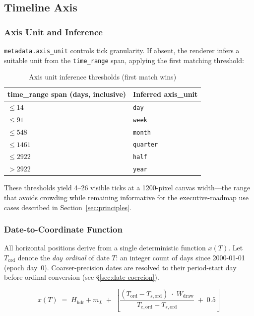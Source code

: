 \subsection{Timeline Axis}
\label{sec:rendering-axis}

\subsubsection{Axis Unit and Inference}
\label{sec:axis-inference}

\texttt{metadata.axis\_unit} controls tick granularity. If absent, the renderer infers a
suitable unit from the \texttt{time\_range} span, applying the first matching threshold:

\begin{table}[h]
\centering
\begin{tabular}{ll}
\toprule
\textbf{time\_range span (days, inclusive)} & \textbf{Inferred axis\_unit} \\
\midrule
$\leq 14$  & \texttt{day}     \\
$\leq 91$  & \texttt{week}    \\
$\leq 548$ & \texttt{month}   \\
$\leq 1461$& \texttt{quarter} \\
$\leq 2922$& \texttt{half}    \\
$> 2922$   & \texttt{year}    \\
\bottomrule
\end{tabular}
\caption{Axis unit inference thresholds (first match wins)}
\label{tab:axis-inference}
\end{table}

These thresholds yield 4--26 visible ticks at a 1200-pixel canvas width---the range that
avoids crowding while remaining informative for the executive-roadmap use cases described
in Section~\ref{sec:principles}.

\subsubsection{Date-to-Coordinate Function}
\label{sec:date-to-x}

All horizontal positions derive from a single deterministic function $x(T)$. Let
$T_{\mathrm{ord}}$ denote the \emph{day ordinal} of date $T$: an integer count of days
since 2000-01-01 (epoch day~0). Coarser-precision dates are resolved to their period-start
day before ordinal conversion (see \S\ref{sec:date-coercion}).

\[
  x(T) \;=\; H_{\mathrm{hdr}} + m_L \;+\;
  \left\lfloor
    \dfrac{
      (T_{\mathrm{ord}} - T_{s,\mathrm{ord}}) \;\cdot\; W_{\mathrm{draw}}
    }{
      T_{e,\mathrm{ord}} - T_{s,\mathrm{ord}}
    }
    \;+\; 0.5
  \right\rfloor
\]

